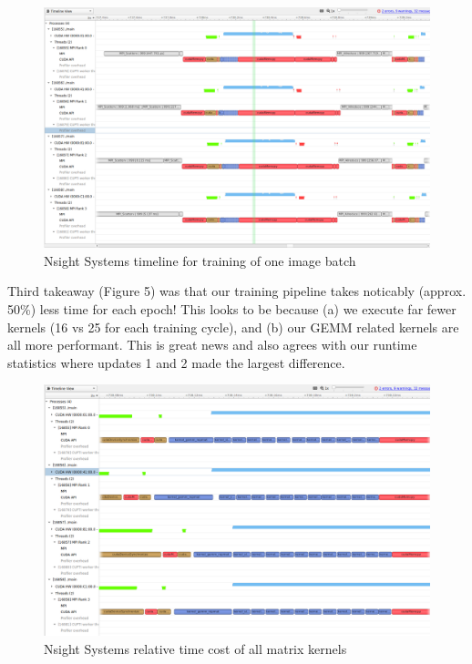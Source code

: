 \documentclass[12pt,letterpaper,twoside]{article}
\begin{document}
\begin{figure}[!htbp]
    \centering
    \includegraphics[scale=0.3]{nsight_systems_batch2.png}
    \caption{Nsight Systems timeline for training of one image batch}
\end{figure}

Third takeaway (Figure 5) was that our training pipeline takes noticably (approx. 50\%) 
less time for each epoch! This looks to be because (a) we execute far fewer kernels (16 
vs 25 for each training cycle), and (b) our GEMM related kernels are all more performant. 
This is great news and also agrees with our runtime statistics where updates 1 and 2 made 
the largest difference.

\begin{figure}[!htbp]
    \centering
    \includegraphics[scale=0.3]{nsight_systems_kernels2.png}
    \caption{Nsight Systems relative time cost of all matrix kernels}
\end{figure}
\end{document}
